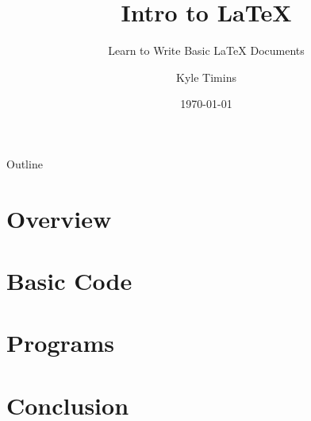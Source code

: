 \documentclass[compress,14pt]{beamer}
\title{Intro to \LaTeX{}}
\subtitle{Learn to Write Basic \LaTeX{} Documents}
\author{Kyle Timins}
\institute[Vermont Technical College]{Vermont Technical College}
\date{\today{}}
\begin{document}
\begin{frame}
    \titlepage
\end{frame}

\section[Outline]{}
\begin{frame}{Outline}
    \begin{multicols}{2}
        \tableofcontents[hideallsubsections]
    \end{multicols}
\end{frame}

\section{Overview}


\section{Basic Code}


\section{Programs}


\section{Conclusion}

\end{document}
